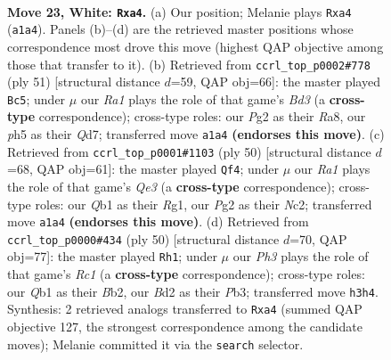 \documentclass[11pt]{article}
\begin{document}
\clearpage

\begin{figure}[p]\centering
\begin{subfigure}{0.46\textwidth}\centering
\resizebox{\linewidth}{!}{%
\newchessgame
\chessboard[
  setfen={1r1q1b2/n1p1r2k/p2p1pp1/3Pp2p/pP2P3/3PRN1P/3B1PP1/RQ3K2 w - - 0 23},
  showmover=false,
  pgfstyle=straightmove, color=movearrow, markmove={a1-a4}
]}
\caption{}
\end{subfigure}\hfill
\begin{subfigure}{0.46\textwidth}\centering
\resizebox{\linewidth}{!}{%
\newchessgame
\chessboard[
  setfen={r5k1/1p1qr1p1/2pb1p2/4p2p/p5nP/P2P2P1/1PP1RPB1/2BQR1K1 b - - 1 26},
  showmover=false,
  pgfstyle=straightmove, color=movearrow, markmove={d6-c5}
]}
\caption{}
\end{subfigure}
\\[4pt]
\begin{subfigure}{0.46\textwidth}\centering
\resizebox{\linewidth}{!}{%
\newchessgame
\chessboard[
  setfen={3rr1k1/1bq3p1/p2ppp1p/1p5P/4P1P1/2PRQP2/PPN5/1K4R1 w - - 5 26},
  showmover=false,
  pgfstyle=straightmove, color=movearrow, markmove={e3-f4}
]}
\caption{}
\end{subfigure}\hfill
\begin{subfigure}{0.46\textwidth}\centering
\resizebox{\linewidth}{!}{%
\newchessgame
\chessboard[
  setfen={2r1r1k1/p2qbppn/1p1pp2p/8/2PP2PP/1PN2Q2/PB2RPK1/2R5 w - - 1 26},
  showmover=false,
  pgfstyle=straightmove, color=movearrow, markmove={c1-h1}
]}
\caption{}
\end{subfigure}
\caption{\textbf{Move 23, White: \texttt{Rxa4}.} (a) Our position; Melanie plays \texttt{Rxa4} (\texttt{a1a4}). Panels (b)--(d) are the retrieved master positions whose correspondence most drove this move (highest QAP objective among those that transfer to it). (b) Retrieved from \texttt{ccrl\_top\_p0002\#778} (ply 51) [structural distance $d$=59, QAP obj=66]: the master played \texttt{Bc5}; under $\mu$ our \emph{Ra1} plays the role of that game's \emph{Bd3} (a \textbf{cross-type} correspondence); cross-type roles: our \emph{P}g2 as their \emph{R}a8, our \emph{p}h5 as their \emph{Q}d7; transferred move \texttt{a1a4} \textbf{(endorses this move)}. (c) Retrieved from \texttt{ccrl\_top\_p0001\#1103} (ply 50) [structural distance $d$=68, QAP obj=61]: the master played \texttt{Qf4}; under $\mu$ our \emph{Ra1} plays the role of that game's \emph{Qe3} (a \textbf{cross-type} correspondence); cross-type roles: our \emph{Q}b1 as their \emph{R}g1, our \emph{P}g2 as their \emph{N}c2; transferred move \texttt{a1a4} \textbf{(endorses this move)}. (d) Retrieved from \texttt{ccrl\_top\_p0000\#434} (ply 50) [structural distance $d$=70, QAP obj=77]: the master played \texttt{Rh1}; under $\mu$ our \emph{Ph3} plays the role of that game's \emph{Rc1} (a \textbf{cross-type} correspondence); cross-type roles: our \emph{Q}b1 as their \emph{B}b2, our \emph{B}d2 as their \emph{P}b3; transferred move \texttt{h3h4}. Synthesis: 2 retrieved analogs transferred to \texttt{Rxa4} (summed QAP objective 127, the strongest correspondence among the candidate moves); Melanie committed it via the \texttt{search} selector.}
\label{fig:thought-m44}
\end{figure}
\end{document}
